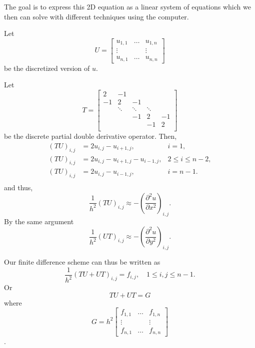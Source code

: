 \documentclass{article}
\newcommand{\dd}[2]{\ensuremath{\frac{\partial^2 #1}{\partial #2^2}}}
\begin{document}
The goal is to express this 2D equation as a linear system of equations which we then can solve with
different techniques using the computer.

Let
\begin{equation}
       U = \begin{bmatrix}
               u_{1,1} & \dots & u_{1,n} \\
               \vdots  &       & \vdots \\
               u_{n,1} & \dots & u_{n,n}
       \end{bmatrix}
\end{equation}
be the discretized version of $u$.

Let 
\begin{equation}
       T = \begin{bmatrix}
               2 & -1 & & & \\
               -1 & 2 & -1 & & \\
               & \ddots & \ddots & \ddots &\\
               & & -1 & 2 & -1\\
               & & & -1 & 2 \\
       \end{bmatrix}
\end{equation}
be the discrete partial double derivative operator.
Then,
\begin{align*}
       (TU)_{i,j} &= 2u_{i,j} - u_{i+1,j}, &i=1,\\
       (TU)_{i,j} &= 2u_{i,j} - u_{i+1,j} - u_{i-1,j}, &2 \leq i \leq n-2,\\
       (TU)_{i,j} &= 2u_{i,j} - u_{i-1,j}, &i=n-1.\\
\end{align*}
and thus,
\[
\frac{1}{h^2}(TU)_{i,j} \approx - \left( \dd{u}{x} \right)_{i,j}.
\]
By the same argument
\[
\frac{1}{h^2}(UT)_{i,j} \approx - \left(\dd{u}{y}\right)_{i,j}.
\]

Our finite difference scheme can thus be written as
\[
\frac{1}{h^2}(TU + UT)_{i,j} = f_{i,j}, \quad 1\leq i,j \leq n-1.
\]
Or
\[
\label{linsys}
TU + UT = G
\]
where
\begin{equation}
G = h^2 \begin{bmatrix}
               f_{1,1} & \dots & f_{1,n} \\
               \vdots  &       & \vdots \\
               f_{n,1} & \dots & f_{n,n}
       \end{bmatrix}
\end{equation}.
\end{document}
